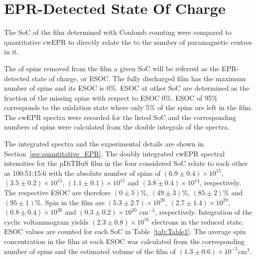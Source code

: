 \section{EPR-Detected State Of Charge}
\label{sec:ESOC}

The SoC of the film determined with Coulomb counting were compared to quantitative cwEPR to directly relate the \rs{,} to the number of paramagnetic centres in it. 


The  of spins removed from the  film  a given SoC will be referred as the EPR-detected state of charge, or ESOC. The fully discharged film has the maximum number of spins and its ESOC is 0\%. ESOC at other SoC are determined as the fraction of the missing spins with respect to ESOC 0\%. ESOC of 95\%  corresponds to the oxidation state where only 5\% of the  spins are left in the film. The cwEPR spectra were recorded for the listed SoC\rs{,} and the corresponding numbers of spins were calculated from the double integrals of the spectra. 


The integrated spectra and the experimental details are shown in Section~\ref{sec:quantitative_EPR}. The doubly integrated cwEPR spectral intensities for the pDiTBuS film in the four considered SoC relate to each other as 100:51:15:6 with the absolute number of spins of $(6.9\pm0.4)\times10^{15}$, $(3.5\pm0.2)\times10^{15}$, $(1.1\pm0.1)\times10^{15}$ and $(3.8\pm0.4)\times10^{14}$, respectively. The respective ESOC are therefore $(0\pm5)$\%, $(49\pm3)$\%, $(85\pm2)$\% and $(95\pm1)$\%. Spin  in the film are $(5.3\pm2.7)\times10^{20}$, $(2.7\pm1.4)\times10^{20}$, $(0.8\pm0.4)\times10^{20}$ and $(0.3\pm0.2)\times10^{20}$ cm$^{-3}$, respectively. Integration of the cyclic voltammogram yields $(2.3\pm0.8)\times10^{16}$ electrons in the reduced state.\\
{} ESOC values are counted for each SoC in Table~\ref{tab:Table1}. The average spin concentration in the film  at each ESOC was calculated from the corresponding number of spins and the estimated volume of the film of $\left(1.3\pm0.6\right)\times10^{-5}$cm$^{3}$.

